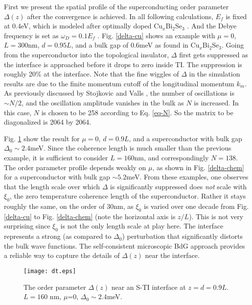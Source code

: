 \documentclass[11pt]{report}
\begin{document}
First we present the spatial profile of the superconducting order parameter $\Delta(z)$
after the convergence is achieved. In all following calculations, $E_f$ is fixed at 0.4eV, 
which is modeled after optimally doped Cu$_x$Bi$_2$Se$_3$ \cite{cu2}. And the Debye frequency
is set as $\omega_D=0.1E_f$ \cite{h-v}.
%
Fig. \ref{delta-cu} shows an example with $\mu=0$, $L=300$nm, $d=0.95L$, and
a bulk gap of 0.6meV as found in Cu$_x$Bi$_2$Se$_3$. 
%
Going from the superconductor into the topological insulator,
$\Delta$ first gets suppressed as the interface is approached before it
drops to zero inside TI. The suppression is roughly 20\% at the interface.
Note that the fine wiggles of $\Delta$ in the simulation results 
are due to the finite momentum cutoff of 
the longitudinal momentum $k_m$. As previously discussed by 
Stojkovic and Valls \cite{s-v}, the number of oscillations is $\sim N/2$, and the 
oscillation amplitude vanishes in the bulk as $N$ is increased. 
In this case, $N$ is chosen to be
258 according to Eq. \eqref{eq-N}. So the matrix to be diagonalized is 2064 by 2064.

Fig. \ref{delta-24} show the result for $\mu=0$, $d=0.9L$, and 
a superconductor with bulk gap $\Delta_0\sim 2.4$meV. Since the coherence length
is much smaller than the previous example, it is sufficient to consider 
$L=160$nm, and correspondingly $N=138$. 
The order parameter profile  
depends weakly on $\mu$, as shown in Fig. \ref{delta-chem} for a superconductor
with bulk gap $\sim 5.2$meV. 
From these examples, one observes that the length scale over which $\Delta$ is 
significantly suppressed does {\it not} scale with $\xi_0$, the zero temperature
coherence length of the superconductor. Rather it stays roughly the same, 
on the order of $30$nm, as $\xi_0$ is varied over one decade from Fig. \ref{delta-cu}
to Fig. \ref{delta-chem} (note the horizontal axis is $z/L$). 
This is not very surprising since $\xi_0$ is not the only length scale at play here.
The interface represents a strong (as compared to $\Delta_0$) perturbation that 
significantly distorts the bulk wave functions.
The self-consistent microscopic BdG approach provides a reliable way to
capture the details of $\Delta(z)$ near the interface.


\begin{figure}
\texttt{[image: dt.eps]}
\caption{The order parameter $\Delta(z)$ near an S-TI interface at $
z=d=0.9L$. $L=160$ nm, $\mu$=0, $\Delta_0\sim 2.4$meV.}
\label{delta-24}
\end{figure}
\end{document}
